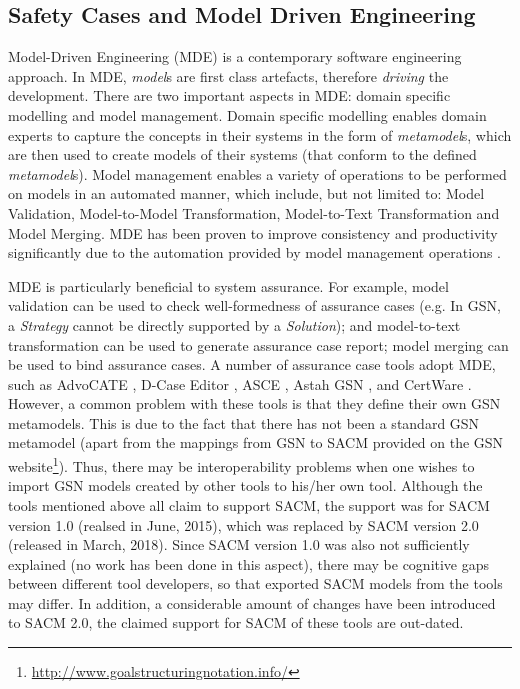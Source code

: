 \subsection{Safety Cases and Model Driven Engineering}
Model-Driven Engineering (MDE) is a contemporary software engineering approach. 
In MDE, \textit{model}s are first class artefacts, therefore \textit{driving} the development. 
There are two important aspects in MDE: domain specific modelling and model management. 
Domain specific modelling enables domain experts to capture the concepts in their systems in the form of \textit{metamodel}s, which are then used to create models of their systems (that conform to the defined \textit{metamodel}s). 
Model management enables a variety of operations to be performed on models in an automated manner, which include, but not limited to: Model Validation, Model-to-Model Transformation, Model-to-Text Transformation and Model Merging.
MDE has been proven to improve consistency and productivity significantly due to the automation provided by model management operations \cite{jaaksi2002developing, karna2009evaluating}. 

MDE is particularly beneficial to system assurance.
For example, model validation can be used to check well-formedness of assurance cases (e.g. In GSN, a \textit{Strategy} cannot be directly supported by a \textit{Solution}); and model-to-text transformation can be used to generate assurance case report; model merging can be used to bind assurance cases. 
A number of assurance case tools adopt MDE, such as AdvoCATE \cite{denney2017tool}, D-Case Editor \cite{matsuno2010dependability}, ASCE \cite{netkachova2014tool}, Astah GSN \cite{larrucea2017supporting}, and CertWare \cite{barry2011certware}. 
However, a common problem with these tools is that they define their own GSN metamodels. 
This is due to the fact that there has not been a standard GSN metamodel (apart from the mappings from GSN to SACM provided on the GSN website\footnote{\url{http://www.goalstructuringnotation.info/}}). 
Thus, there may be interoperability problems when one wishes to import GSN models created by other tools to his/her own tool. 
Although the tools mentioned above all claim to support SACM, the support was for SACM version 1.0 (realsed in June, 2015), which was replaced by SACM version 2.0 (released in March, 2018).
Since SACM version 1.0 was also not sufficiently explained (no work has been done in this aspect), there may be cognitive gaps between different tool developers, so that exported SACM models from the tools may differ.
In addition, a considerable amount of changes have been introduced to SACM 2.0, the claimed support for SACM of these tools are out-dated. 

